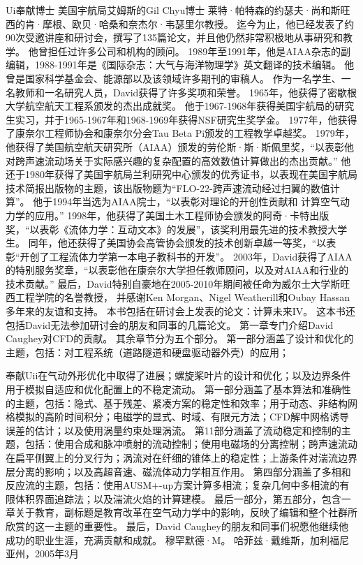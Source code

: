 \documentclass[UTF8,11pt,a4paper,openany,fontset=fandol]{ctexbook}
\begin{document}
Ui奉献博士 美国宇航局艾姆斯的Gil Chyu博士 莱特·帕特森的约瑟夫·尚和斯旺西的肯·摩根、欧贝·哈桑和奈杰尔·韦瑟里尔教授。 迄今为止，他已经发表了约90次受邀讲座和研讨会，撰写了135篇论文，并且他仍然非常积极地从事研究和教学。 他曾担任过许多公司和机构的顾问。 1989年至1991年，他是AIAA杂志的副编辑，1988-1991年是《国际杂志：大气与海洋物理学》英文翻译的技术编辑。 他曾是国家科学基金会、能源部以及该领域许多期刊的审稿人。 作为一名学生、一名教师和一名研究人员，David获得了许多奖项和荣誉。 1965年，他获得了密歇根大学航空航天工程系颁发的杰出成就奖。 他于1967-1968年获得美国宇航局的研究生实习，并于1965-1967年和1968-1969年获得NSF研究生奖学金。 1977年，他获得了康奈尔工程师协会和康奈尔分会Tau Beta Pi颁发的工程教学卓越奖。 1979年，他获得了美国航空航天研究所（AIAA）颁发的劳伦斯·斯·斯佩里奖，“以表彰他对跨声速流动场关于实际感兴趣的复杂配置的高效数值计算做出的杰出贡献。” 他还于1980年获得了美国宇航局兰利研究中心颁发的优秀证书，以表现在美国宇航局技术简报出版物的主题，该出版物题为“FLO-22-跨声速流动经过扫翼的数值计算”。 他于1994年当选为AIAA院士，“以表彰对理论的开创性贡献和 计算空气动力学的应用。” 1998年，他获得了美国土木工程师协会颁发的阿奇·卡特出版奖，“以表彰《流体力学：互动文本》的发展”，该奖利用最先进的技术教授大学生。 同年，他还获得了美国协会高管协会颁发的技术创新卓越一等奖，“以表彰“开创了工程流体力学第一本电子教科书的开发”。 2003年，David获得了AIAA的特别服务奖章，“以表彰他在康奈尔大学担任教师顾问，以及对AIAA和行业的技术贡献。” 最后，David特别自豪地在2005-2010年期间被任命为威尔士大学斯旺西工程学院的名誉教授， 并感谢Ken Morgan、Nigel Weatherill和Oubay Hassan多年来的友谊和支持。 本书包括在研讨会上发表的论文：计算未来IV。 这本书还包括David无法参加研讨会的朋友和同事的几篇论文。 第一章专门介绍David Caughey对CFD的贡献。 其余章节分为五个部分。 第一部分涵盖了设计和优化的主题，包括：对工程系统（道路隧道和硬盘驱动器外壳）的应用；

奉献Uii在气动外形优化中取得了进展；螺旋桨叶片的设计和优化；以及边界条件用于模拟自适应和优化配置上的不稳定流动。 第一部分涵盖了基本算法和准确性的主题，包括：隐式、基于残差、紧凑方案的稳定性和效率；用于动态、非结构网格模拟的高阶时间积分；电磁学的显式、时域、有限元方法；CFD解中网格诱导误差的估计；以及使用涡量约束处理涡流。 第11部分涵盖了流动稳定和控制的主题，包括：使用合成和脉冲喷射的流动控制；使用电磁场的分离控制；跨声速流动在扁平侧翼上的分叉行为；涡流对在纤细的锥体上的稳定性；上游条件对湍流边界层分离的影响；以及高超音速、磁流体动力学相互作用。 第四部分涵盖了多相和反应流的主题，包括：使用AUSM+-up方案计算多相流；复杂几何中多相流的有限体积界面追踪法；以及湍流火焰的计算建模。 最后一部分，第五部分，包含一章关于教育，副标题是教育改革在空气动力学中的影响，反映了编辑和整个社群所欣赏的这一主题的重要性。 最后，David Caughey的朋友和同事们祝愿他继续他成功的职业生涯，充满贡献和成就。 穆罕默德·M。 哈菲兹·戴维斯，加利福尼亚州，2005年3月
\end{document}
